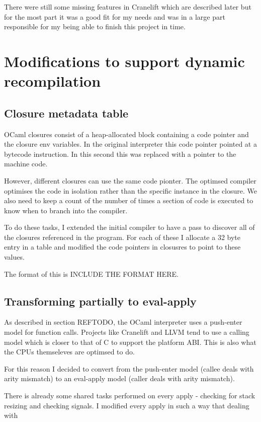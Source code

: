 There were still some missing features in Cranelift which are described later but for the most
part it was a good fit for my needs and was in a large part responsible for my being able to
finish this project in time.

\section{Modifications to support dynamic recompilation}

\subsection{Closure metadata table}

OCaml closures consist of a heap-allocated block containing a code pointer and the closure env
variables. In the original interpreter this code pointer pointed at a bytecode instruction. In this
second this was replaced with a pointer to the machine code.

However, different closures can use the same code pionter. The optimsed compiler optimises the code
in isolation rather than the specific instance in the closure. We also need to keep a count of the
number of times a section of code is executed to know when to branch into the compiler.

To do these tasks, I extended the initial compiler to have a pass to discover all of the closures
referenced in the program. For each of these I allocate a 32 byte entry in a table and modified the
code pointers in closusres to point to these values.

The format of this is INCLUDE THE FORMAT HERE.

\subsection{Transforming partially to eval-apply}

As described in section REFTODO, the OCaml interpreter uses a push-enter model for function calls.
Projects like Cranelift and LLVM tend to use a calling model which is closer to that of C to
support the platform ABI. This is also what the CPUs themseleves are optimsed to do.

For this reason I decided to convert from the push-enter model (callee deals with arity mismatch)
to an eval-apply model (caller deals with arity mismatch).

There is already some shared tasks performed on every apply - checking for stack resizing and
checking signals. I modified every apply in such a way that dealing with

